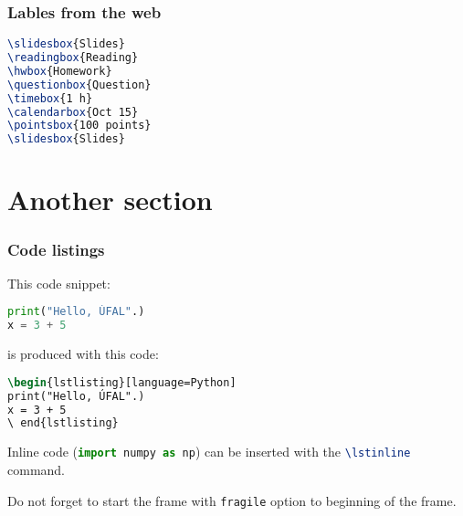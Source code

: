 \documentclass[handout,aspectratio=169]{beamer}
\begin{document}

\begin{frame}[fragile]
    \frametitle{Lables from the web}


    \begin{lstlisting}[language=TeX]
\slidesbox{Slides}
\readingbox{Reading}
\hwbox{Homework}
\questionbox{Question}
\timebox{1 h}
\calendarbox{Oct 15}
\pointsbox{100 points}
\slidesbox{Slides}
    \end{lstlisting}
\end{frame}

\section{Another section}

\begin{frame}[fragile]
    \frametitle{Code listings}

    This code snippet:
    \begin{lstlisting}[language=Python]
print("Hello, ÚFAL".)
x = 3 + 5
    \end{lstlisting}

    is produced with this code:
    \begin{lstlisting}[language=TeX]
\begin{lstlisting}[language=Python]
print("Hello, ÚFAL".)
x = 3 + 5
\ end{lstlisting}
    \end{lstlisting}

    Inline code (\lstinline[language=Python]{import numpy as np}) can be
    inserted with the \lstinline[language=TeX]{\lstinline} command.

    Do not forget to start the frame with \lstinline[language=TeX]{fragile}
    option to beginning of the frame.

\end{frame}

\end{document}
